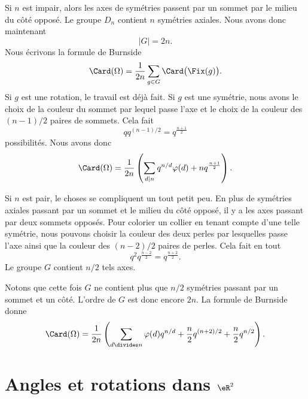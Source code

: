 Si \( n\) est impair, alors les axes de symétries passent par un sommet par le milieu du côté opposé. Le groupe \( D_n\) contient \( n\) symétries axiales. Nous avons donc maintenant
\begin{equation}
    | G |=2n.
\end{equation}
Nous écrivons la formule de Burnside
\begin{equation}
    \Card(\Omega)=\frac{1}{ 2n }\sum_{g\in G}\Card\big( \Fix(g) \big).
\end{equation}
Si \( g\) est une rotation, le travail est déjà fait. Si \( g\) est une symétrie, nous avons le choix de la couleur du sommet par lequel passe l'axe et le choix de la couleur des \( (n-1)/2\) paires de sommets. Cela fait
\begin{equation}
    qq^{(n-1)/2}=q^{\frac{ n+1 }{2}}
\end{equation}
possibilités. Nous avons donc
\begin{equation}
    \Card(\Omega)=\frac{1}{ 2n }\left( \sum_{d|n}q^{n/d}\varphi(d)+nq^{\frac{ n+1 }{2}} \right).
\end{equation}

Si \( n\) est pair, le choses se compliquent un tout petit peu. En plus de symétries axiales passant par un sommet et le milieu du côté opposé, il y a les axes passant par deux sommets opposés. Pour colorier un collier en tenant compte d'une telle symétrie, nous pouvons choisir la couleur des deux perles par lesquelles passe l'axe ainsi que la couleur des \( (n-2)/2\) paires de perles. Cela fait en tout
\begin{equation}
    q^2q^{\frac{ n-2 }{2}}=q^{\frac{ n+2 }{2}}.
\end{equation}
Le groupe \( G\) contient \( n/2\) tels axes.

Notons que cette fois \( G\) ne contient plus que \( n/2\) symétries passant par un sommet et un côté. L'ordre de $G$ est donc encore \( 2n\). La formule de Burnside donne
\begin{equation}
    \Card(\Omega)=\frac{1}{ 2n }\left( \sum_{d\divides n}\varphi(d)q^{n/d}+\frac{ n }{2}q^{(n+2)/2}+\frac{ n }{2}q^{n/2} \right).
\end{equation}


\section{Angles et rotations dans \( \eR^2\)}

